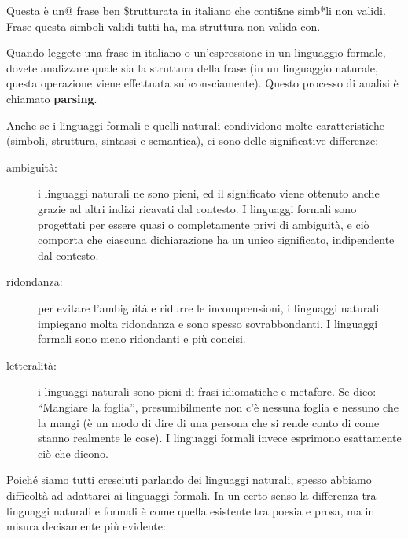 \documentclass[10pt]{book}
\begin{document}
Questa è un@ frase ben \$trutturata in italiano che conti\verb'&'ne simb*li non validi.\\
Frase questa simboli validi tutti ha, ma struttura non valida con.

Quando leggete una frase in italiano o un'espressione in un linguaggio formale, dovete analizzare quale sia la struttura della frase (in un linguaggio naturale, questa operazione viene effettuata subconsciamente). Questo processo di analisi è chiamato {\bf parsing}.

Anche se i linguaggi formali e quelli naturali condividono molte    caratteristiche (simboli, struttura, sintassi e semantica), ci sono delle   significative differenze:

\begin{description}

\item[ambiguità:] i linguaggi naturali ne sono pieni, ed il significato viene   ottenuto anche grazie ad altri indizi ricavati dal contesto. I linguaggi formali sono progettati per essere quasi o completamente privi di ambiguità, e ciò comporta che ciascuna dichiarazione ha un unico significato, indipendente dal contesto.

\item[ridondanza:] per evitare l'ambiguità e ridurre le incomprensioni, i linguaggi naturali impiegano molta ridondanza e sono spesso sovrabbondanti. I linguaggi formali sono meno ridondanti e più concisi.

\item[letteralità:] i linguaggi naturali sono pieni di frasi idiomatiche e metafore. Se dico: ``Mangiare la foglia'', presumibilmente non c'è nessuna foglia e nessuno che la mangi (è un modo di dire di una persona che si rende conto di come stanno realmente le cose). I linguaggi formali invece esprimono esattamente ciò che dicono.

\end{description}

Poiché siamo tutti cresciuti parlando dei linguaggi naturali, spesso abbiamo difficoltà ad adattarci ai linguaggi formali. In un certo senso la differenza tra linguaggi naturali e formali è come quella esistente tra poesia e prosa, ma in misura decisamente più evidente:
\end{document}
